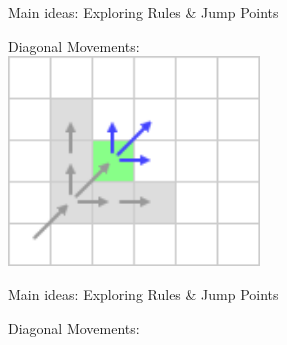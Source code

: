 \documentclass{presentation}
\begin{document}
\begin{frame}{Main ideas: Exploring Rules \& Jump Points}
	\begin{center}
		Diagonal Movements:\\
		\vspace{5mm}
		\includegraphics[width=0.5\textwidth]{figures/extra_geschnitten/dm.png}
	\end{center}
\end{frame}


\begin{frame}{Main ideas: Exploring Rules \& Jump Points}
		\begin{center}
		Diagonal Movements:\\
		\vspace{5mm}
		\begin{minipage}{0.3\textwidth}
		\end{minipage}%
		\pause%
		\hfill%
		\begin{minipage}{0.3\textwidth}
		\end{minipage}%
		\pause%
		\hfill%
		\begin{minipage}{0.3\textwidth}
		\end{minipage}%
	\end{center}
\end{frame}
\end{document}
